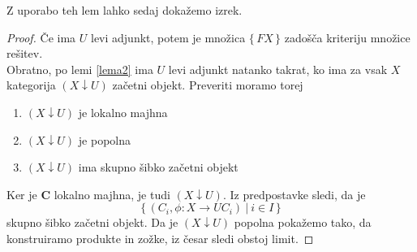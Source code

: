 \documentclass[12pt,a4paper]{book}
\theoremstyle{definition}
\theoremstyle{plain}
\theoremstyle{definition}
\theoremstyle{remark}
\newcommand{\cat}[1]{\textbf{#1}}
\renewcommand{\set}[1]{\{\,#1\,\}}
\begin{document}
Z uporabo teh lem lahko sedaj dokažemo izrek.
\begin{proof}
Če ima $U$ levi adjunkt, potem je množica $\set{FX}$ zadošča kriteriju množice rešitev.\\
Obratno, po lemi \ref{lema2} ima $U$ levi adjunkt natanko takrat, ko ima za vsak $X$ kategorija $(X \downarrow U)$ začetni objekt. Preveriti moramo torej
\begin{enumerate}
\item $(X \downarrow U)$ je lokalno majhna
\item $(X \downarrow U)$ je popolna
\item $(X \downarrow U)$ ima skupno šibko začetni objekt
\end{enumerate}
Ker je $\cat{C}$ lokalno majhna, je tudi $(X \downarrow U)$. Iz predpostavke sledi, da je
$$\set{(C_i, \phi : X \to UC_i) \ \vert \ i \in I}$$
skupno šibko začetni objekt. Da je $(X \downarrow U)$ popolna pokažemo tako, da konstruiramo produkte in zožke, iz česar sledi obstoj limit. 
\end{proof}
\end{document}
